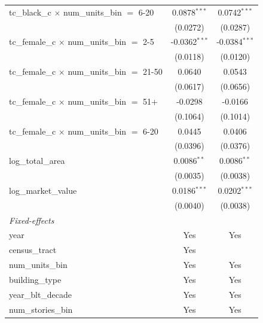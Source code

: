 \begin{tabular}{lcc}
   tc\_black\_c $\times$ num\_units\_bin $=$ 6-20        & 0.0878$^{***}$  & 0.0742$^{***}$\\   
                                                         & (0.0272)        & (0.0287)\\   
   tc\_female\_c $\times$ num\_units\_bin $=$ 2-5        & -0.0362$^{***}$ & -0.0384$^{***}$\\   
                                                         & (0.0118)        & (0.0120)\\   
   tc\_female\_c $\times$ num\_units\_bin $=$ 21-50      & 0.0640          & 0.0543\\   
                                                         & (0.0617)        & (0.0656)\\   
   tc\_female\_c $\times$ num\_units\_bin $=$ 51+        & -0.0298         & -0.0166\\   
                                                         & (0.1064)        & (0.1014)\\   
   tc\_female\_c $\times$ num\_units\_bin $=$ 6-20       & 0.0445          & 0.0406\\   
                                                         & (0.0396)        & (0.0376)\\   
   log\_total\_area                                      & 0.0086$^{**}$   & 0.0086$^{**}$\\   
                                                         & (0.0035)        & (0.0038)\\   
   log\_market\_value                                    & 0.0186$^{***}$  & 0.0202$^{***}$\\   
                                                         & (0.0040)        & (0.0038)\\   
   \midrule
   \emph{Fixed-effects}\\
   year                                                  & Yes             & Yes\\  
   census\_tract                                         & Yes             & \\  
   num\_units\_bin                                       & Yes             & Yes\\  
   building\_type                                        & Yes             & Yes\\  
   year\_blt\_decade                                     & Yes             & Yes\\  
   num\_stories\_bin                                     & Yes             & Yes\\  

\end{tabular}
